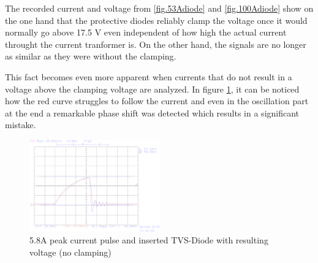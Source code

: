 The recorded current and voltage from \ref{fig.53Adiode} and \ref{fig.100Adiode} show on the
one hand that the protective diodes reliably clamp the voltage once it would normally go above 17.5 V even
independent of how high the actual current throught the current tranformer is. On the other hand, the signals are no longer as similar as they were 
without the clamping.


This fact becomes even more apparent when currents that do not result in a voltage above the clamping voltage are analyzed.
In figure \ref{fig.comparison}, it can be noticed how the red curve struggles to follow the current and even in the oscillation part at the end a remarkable phase shift was detected which results in a significant
mistake.


\begin{figure}[ht]
	\centering
	\includegraphics[width=0.5\textwidth]{figures/Voltage_Clamping/TEK00008.eps}		
	\caption[Kurze Abbildungsbeschreibung]{5.8A peak current pulse and inserted TVS-Diode with resulting voltage (no clamping)} 
	\label{fig.comparison}
\end{figure}



